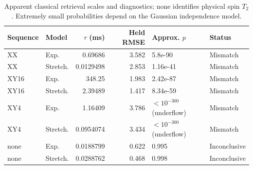 \begin{table}[htbp]
\centering\small
\begin{tabular}{llrrll}
\toprule
Sequence & Model & $\tau$ (ms) & Held RMSE & Approx. $p$ & Status \\
\midrule
XX & Exp. & 0.69686 & 3.582 & 5.8e-90 & Mismatch \\
XX & Stretch. & 0.0129498 & 2.853 & 1.16e-41 & Mismatch \\
XY16 & Exp. & 348.25 & 1.983 & 2.42e-87 & Mismatch \\
XY16 & Stretch. & 2.39489 & 1.417 & 8.34e-59 & Mismatch \\
XY4 & Exp. & 1.16409 & 3.786 & $<10^{-300}$ (underflow) & Mismatch \\
XY4 & Stretch. & 0.0954074 & 3.434 & $<10^{-300}$ (underflow) & Mismatch \\
none & Exp. & 0.0188799 & 0.622 & 0.995 & Inconclusive \\
none & Stretch. & 0.0288762 & 0.468 & 0.998 & Inconclusive \\
\bottomrule\end{tabular}
\caption{Apparent classical retrieval scales and diagnostics; none identifies physical spin $T_2$. Extremely small probabilities depend on the Gaussian independence model.}
\end{table}
